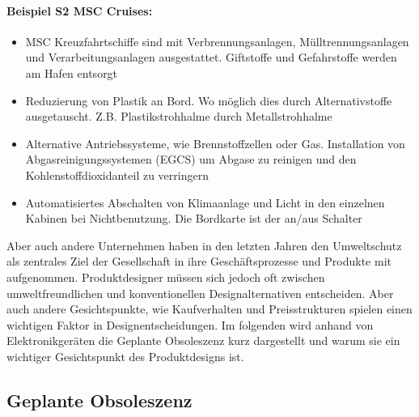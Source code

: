 \documentclass[13pt,titlepage]{article}
\begin{document}
	\paragraph{Beispiel S2 MSC Cruises\protect\footnotemark:}
	\begin{itemize}
	  \item MSC Kreuzfahrtschiffe sind mit Verbrennungsanlagen, Mülltrennungsanlagen und Verarbeitungsanlagen ausgestattet. Giftstoffe und Gefahrstoffe werden am Hafen entsorgt
	  \item Reduzierung von Plastik an Bord. Wo möglich dies durch Alternativstoffe ausgetauscht. Z.B. Plastikstrohhalme durch Metallstrohhalme
	  \item Alternative Antriebssysteme, wie Brennstoffzellen oder Gas. Installation von Abgasreinigungssystemen (EGCS) um Abgase zu reinigen und den Kohlenstoffdioxidanteil zu verringern
	  \item Automatisiertes Abschalten von Klimaanlage und Licht in den einzelnen Kabinen bei Nichtbenutzung. Die Bordkarte ist der an/aus Schalter
	\end{itemize}
	
	Aber auch andere Unternehmen haben in den letzten Jahren den Umweltschutz als zentrales Ziel der Gesellschaft in ihre Geschäftsprozesse und Produkte mit aufgenommen. 
Produktdesigner müssen sich jedoch oft zwischen umweltfreundlichen und konventionellen Designalternativen entscheiden.
Aber auch andere Gesichtspunkte, wie Kaufverhalten und Preisstrukturen spielen einen wichtigen Faktor in Designentscheidungen.
Im folgenden wird anhand von Elektronikger\"aten die Geplante Obsoleszenz kurz dargestellt und warum sie ein wichtiger Gesichtspunkt des Produktdesigns ist.

\subsection {Geplante Obsoleszenz}
\end{document}
